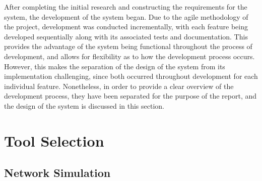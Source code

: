 











After completing the initial research and constructing the requirements for the system, the development of the system began.
Due to the agile methodology of the project, development was conducted incrementally, with each feature being developed sequentially along with its associated tests and documentation.
This provides the advantage of the system being functional throughout the process of development, and allows for flexibility as to how the development process occurs.
However, this makes the separation of the design of the system from its implementation challenging, since both occurred throughout development for each individual feature.
Nonetheless, in order to provide a clear overview of the development process, they have been separated for the purpose of the report, and the design of the system is discussed in this section.

\section{Tool Selection}
\label{tool_selection}

\subsection{Network Simulation}

